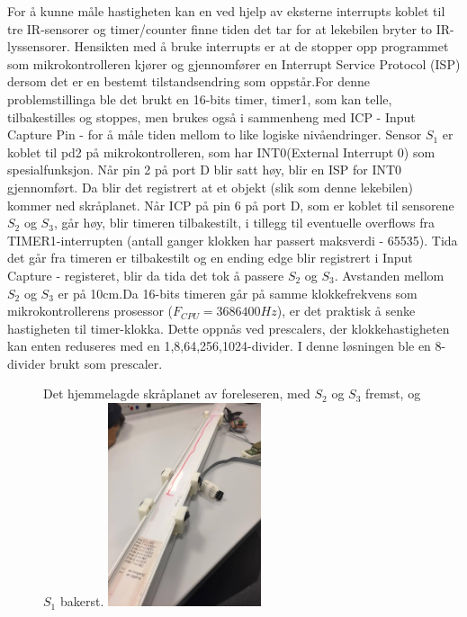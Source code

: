 \documentclass[11pt, a4paper]{report}
\begin{document}
For å kunne måle hastigheten kan en ved hjelp av eksterne interrupts koblet til tre IR-sensorer og timer/counter finne tiden det tar for at lekebilen bryter to IR-lyssensorer.
Hensikten med å bruke interrupts er at de stopper opp programmet som mikrokontrolleren kjører og gjennomfører en Interrupt Service Protocol (ISP) dersom det er en bestemt tilstandsendring som oppstår.\newline For denne problemstillinga ble det brukt en 16-bits timer, timer1, som kan telle, tilbakestilles og stoppes, men brukes også i sammenheng med ICP - Input Capture Pin - for å måle tiden mellom to like logiske nivåendringer. 
Sensor $S_{1}$ er koblet til pd2 på mikrokontrolleren, som har INT0(External Interrupt 0) som spesialfunksjon. Når pin 2 på port D blir satt høy, blir en ISP for INT0 gjennomført. Da blir det registrert at et objekt (slik som denne lekebilen) kommer ned skråplanet. Når ICP på pin 6 på port D, som er koblet til sensorene $S_{2}$ og $S_{3}$, går høy, blir timeren tilbakestilt, i tillegg til eventuelle overflows fra TIMER1-interrupten (antall ganger klokken har passert maksverdi - 65535). Tida det går fra timeren er tilbakestilt og en ending edge blir registrert i Input Capture - registeret, blir da tida det tok å passere $S_{2}$ og $S_{3}$. Avstanden mellom $S_{2}$ og $S_{3}$ er på 10cm.\newline Da 16-bits timeren går på samme klokkefrekvens som mikrokontrollerens prosessor ($F_{CPU} = 3686400 Hz$), er det praktisk å senke hastigheten til timer-klokka. Dette oppnås ved prescalers, der klokkehastigheten kan enten reduseres med en 1,8,64,256,1024-divider. I denne løsningen ble en 8-divider brukt som prescaler.

\begin{figure}
  \centering
  \captionbox
  {Det hjemmelagde skråplanet av foreleseren, med $S_{2}$ og $S_{3}$ fremst, og $S_{1}$ bakerst.}
  {\includegraphics[width=0.4\textwidth, right]{field.jpg}}
\end{figure}
\end{document}
